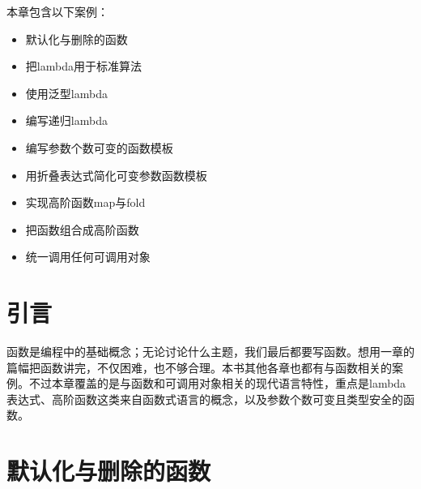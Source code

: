 
本章包含以下案例：



\begin{itemize}
\item 默认化与删除的函数



\item 把lambda用于标准算法



\item 使用泛型lambda



\item 编写递归lambda



\item 编写参数个数可变的函数模板



\item 用折叠表达式简化可变参数函数模板



\item 实现高阶函数map与fold



\item 把函数组合成高阶函数



\item 统一调用任何可调用对象

\end{itemize}



\section{引言}



函数是编程中的基础概念；无论讨论什么主题，我们最后都要写函数。想用一章的篇幅把函数讲完，不仅困难，也不够合理。本书其他各章也都有与函数相关的案例。不过本章覆盖的是与函数和可调用对象相关的现代语言特性，重点是lambda表达式、高阶函数这类来自函数式语言的概念，以及参数个数可变且类型安全的函数。



\section{默认化与删除的函数}


